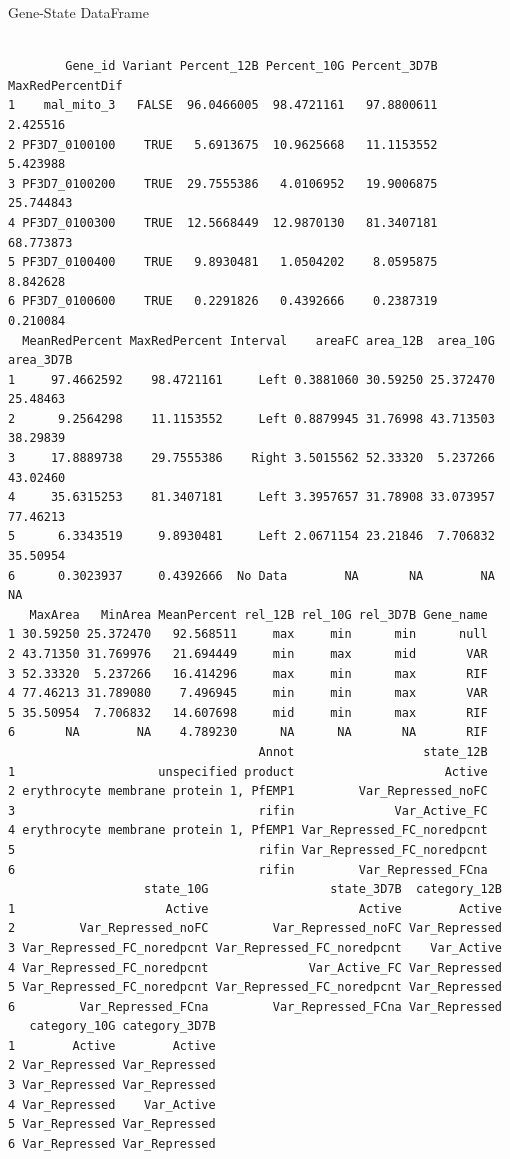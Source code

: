 \documentclass[11pt]{article}
\begin{document}
Gene-State DataFrame
\begin{verbatim}

        Gene_id Variant Percent_12B Percent_10G Percent_3D7B MaxRedPercentDif
1    mal_mito_3   FALSE  96.0466005  98.4721161   97.8800611         2.425516
2 PF3D7_0100100    TRUE   5.6913675  10.9625668   11.1153552         5.423988
3 PF3D7_0100200    TRUE  29.7555386   4.0106952   19.9006875        25.744843
4 PF3D7_0100300    TRUE  12.5668449  12.9870130   81.3407181        68.773873
5 PF3D7_0100400    TRUE   9.8930481   1.0504202    8.0595875         8.842628
6 PF3D7_0100600    TRUE   0.2291826   0.4392666    0.2387319         0.210084
  MeanRedPercent MaxRedPercent Interval    areaFC area_12B  area_10G area_3D7B
1     97.4662592    98.4721161     Left 0.3881060 30.59250 25.372470  25.48463
2      9.2564298    11.1153552     Left 0.8879945 31.76998 43.713503  38.29839
3     17.8889738    29.7555386    Right 3.5015562 52.33320  5.237266  43.02460
4     35.6315253    81.3407181     Left 3.3957657 31.78908 33.073957  77.46213
5      6.3343519     9.8930481     Left 2.0671154 23.21846  7.706832  35.50954
6      0.3023937     0.4392666  No Data        NA       NA        NA        NA
   MaxArea   MinArea MeanPercent rel_12B rel_10G rel_3D7B Gene_name
1 30.59250 25.372470   92.568511     max     min      min      null
2 43.71350 31.769976   21.694449     min     max      mid       VAR
3 52.33320  5.237266   16.414296     max     min      max       RIF
4 77.46213 31.789080    7.496945     min     min      max       VAR
5 35.50954  7.706832   14.607698     mid     min      max       RIF
6       NA        NA    4.789230      NA      NA       NA       RIF
                                   Annot                  state_12B
1                    unspecified product                     Active
2 erythrocyte membrane protein 1, PfEMP1         Var_Repressed_noFC
3                                  rifin              Var_Active_FC
4 erythrocyte membrane protein 1, PfEMP1 Var_Repressed_FC_noredpcnt
5                                  rifin Var_Repressed_FC_noredpcnt
6                                  rifin         Var_Repressed_FCna
                   state_10G                 state_3D7B  category_12B
1                     Active                     Active        Active
2         Var_Repressed_noFC         Var_Repressed_noFC Var_Repressed
3 Var_Repressed_FC_noredpcnt Var_Repressed_FC_noredpcnt    Var_Active
4 Var_Repressed_FC_noredpcnt              Var_Active_FC Var_Repressed
5 Var_Repressed_FC_noredpcnt Var_Repressed_FC_noredpcnt Var_Repressed
6         Var_Repressed_FCna         Var_Repressed_FCna Var_Repressed
   category_10G category_3D7B
1        Active        Active
2 Var_Repressed Var_Repressed
3 Var_Repressed Var_Repressed
4 Var_Repressed    Var_Active
5 Var_Repressed Var_Repressed
6 Var_Repressed Var_Repressed
\end{verbatim}
\end{document}
